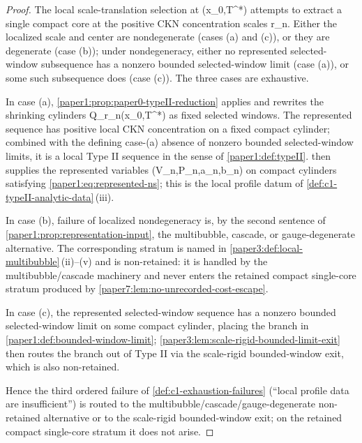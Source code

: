\documentclass[11pt]{amsart}
\def\({}%
\def\){}%
\theoremstyle{plain}
\theoremstyle{definition}
\theoremstyle{remark}
\begin{document}
\begin{proof}
The local scale-translation selection at \((x_0,T^*)\) attempts to extract
a single compact core at the positive CKN concentration scales
\(r_n\).  Either the localized scale and center are
nondegenerate (cases \textup{(a)} and \textup{(c)}), or they are
degenerate (case \textup{(b)}); under nondegeneracy, either no represented
selected-window subsequence has a nonzero bounded selected-window limit
(case \textup{(a)}), or some such subsequence does (case \textup{(c)}).
The three cases are exhaustive.

In case \textup{(a)},
\cref{paper1:prop:paper0-typeII-reduction} applies and rewrites the
shrinking cylinders \(Q_{r_n}(x_0,T^*)\) as fixed selected windows.  The
represented sequence has positive local CKN concentration on a fixed
compact cylinder; combined with the defining case-\textup{(a)} absence of
nonzero bounded selected-window limits, it is a local Type II sequence in the
sense of
\cref{paper1:def:typeII}.   then
supplies the represented variables \((V_n,P_n,a_n,b_n)\) on compact
cylinders satisfying \eqref{paper1:eq:represented-ns}; this is the local
profile datum of \cref{def:c1-typeII-analytic-data}\,\textup{(iii)}.

In case \textup{(b)}, failure of localized nondegeneracy is, by the second
sentence of \cref{paper1:prop:representation-input}, the multibubble,
cascade, or gauge-degenerate alternative.  The corresponding stratum is
named in \cref{paper3:def:local-multibubble}\,\textup{(ii)}--\textup{(v)}
and is non-retained: it is handled by the multibubble/cascade machinery
and never enters the retained compact single-core stratum produced by
\cref{paper7:lem:no-unrecorded-cost-escape}.

In case \textup{(c)}, the represented selected-window sequence has a
nonzero bounded selected-window limit on some compact cylinder, placing
the branch in \cref{paper1:def:bounded-window-limit};
\cref{paper3:lem:scale-rigid-bounded-limit-exit} then routes the branch
out of Type II via the scale-rigid bounded-window exit, which is also
non-retained.

Hence the third ordered failure of \cref{def:c1-exhaustion-failures}
(``local profile data are insufficient'') is routed to the
multibubble/cascade/gauge-degenerate non-retained alternative or to the
scale-rigid bounded-window exit; on the retained compact single-core
stratum it does not arise.
\end{proof}
\end{document}
